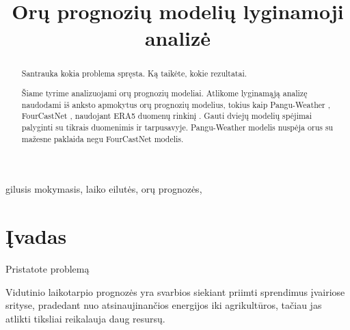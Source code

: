 \documentclass[conference]{IEEEtran}
\begin{document}
\title{Orų prognozių modelių lyginamoji analizė}

\author{
\and
{}
\and
{}
}

\maketitle

\begin{abstract}
Santrauka kokia problema spręsta. Ką taikėte, kokie rezultatai. 

Šiame tyrime analizuojami orų prognozių modeliai. Atlikome lyginamąją analizę naudodami iš anksto apmokytus orų prognozių modelius, tokius kaip Pangu-Weather \cite{bi2023accurate}, FourCastNet \cite{pathak2022fourcastnet}, naudojant ERA5 duomenų rinkinį \cite{data}. Gauti dviejų modelių spėjimai palyginti su tikrais duomenimis ir tarpusavyje. Pangu-Weather modelis nuspėja orus su mažesne paklaida negu FourCastNet modelis.

\end{abstract}

\begin{IEEEkeywords}
gilusis mokymasis, laiko eilutės, orų prognozės, 
\end{IEEEkeywords}

\section{Įvadas}
Pristatote problemą

 Vidutinio laikotarpio prognozės yra svarbios siekiant priimti sprendimus įvairiose srityse, pradedant nuo atsinaujinančios energijos iki agrikultūros, tačiau jas atlikti tiksliai reikalauja daug resursų.
\end{document}
